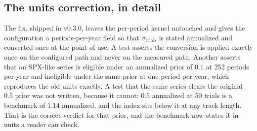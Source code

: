 \subsection{The units correction, in detail}\label{app:unitsfix}

The fix, shipped in v0.3.0, leaves the per-period kernel untouched and gives the configuration a periods-per-year field so that $\sigma_{\text{trials}}$ is stated annualized and converted once at the point of use. A test asserts the conversion is applied exactly once on the configured path and never on the measured path. Another asserts that an SPX-like series is eligible under an annualized prior of $0.1$ at 252 periods per year and ineligible under the same prior at one period per year, which reproduces the old units exactly. A test that the same series clears the original $0.5$ prior was not written, because it cannot: $0.5$ annualized at 50 trials is a benchmark of $1.14$ annualized, and the index sits below it at any track length. That is the correct verdict for that prior, and the benchmark now states it in units a reader can check.
